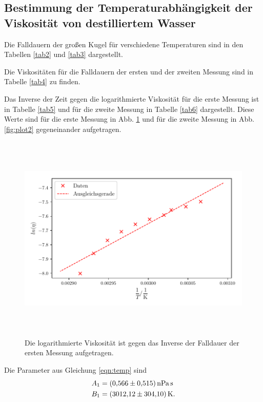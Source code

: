 \subsection{Bestimmung der Temperaturabhängigkeit der Viskosität von destilliertem Wasser}
Die Falldauern der großen Kugel für verschiedene Temperaturen sind in den Tabellen
\ref{tab2} und \ref{tab3} dargestellt.


\noindent Die Viskositäten für die Falldauern der ersten und der zweiten Messung
sind in Tabelle \ref{tab4} zu finden.

\noindent Das Inverse der Zeit gegen die logarithmierte Viskosität für die erste
Messung ist in Tabelle \ref{tab5} und für die zweite Messung in Tabelle
\ref{tab6} dargestellt.
Diese Werte sind für die erste Messung in Abb. \ref{fig:plot1} und für
die zweite Messung in Abb. \ref{fig:plot2} gegeneinander aufgetragen.


\begin{figure}
    \centering
    \includegraphics[width=14cm, height=10cm]{build/plot1.pdf}
    \caption{Die logarithmierte Viskosität ist gegen das Inverse
    der Falldauer der ersten Messung aufgetragen.}
    \label{fig:plot1}
\end{figure}

Die Parameter aus Gleichung \eqref{eqn:temp} sind 
\begin{align*} 
    A_1 &= \SI{0.566(515)}{\nano\pascal\second} \\
    B_1 &= \SI{3012.12 \pm 304.10}{\kelvin}. \\
\end{align*}


